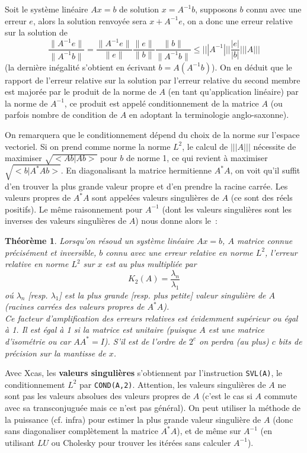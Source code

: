 \documentclass[a4paper,11pt]{article}
\newtheorem{thm}{Théorème}
\begin{document}
\begin{giacjshere}
Soit le syst\`eme lin\'eaire $Ax=b$ de solution $x=A^{-1}b$, 
supposons $b$ connu avec une erreur $e$, alors la solution renvoy\'ee
sera $x+A^{-1}e$, on a donc une erreur relative sur la solution de 
\[ \frac{\|A^{-1}e\|}{\|A^{-1}b\|} = \frac{\|A^{-1}e\|}{\|e\|} 
\frac{\|e\|}{\|b\|}
\frac{\|b\|}{\|A^{-1}b\|}  \leq |||A^{-1}|||  \frac{|e|}{|b|} |||A|||  \]
(la derni\`ere in\'egalit\'e s'obtient en \'ecrivant $b=A(A^{-1}b)$).
On en d\'eduit que le rapport de l'erreur relative sur la solution par l'erreur
relative du second membre est major\'ee par
le produit de la norme de $A$ (en tant qu'application lin\'eaire)
par la norme de $A^{-1}$, ce produit est appel\'e conditionnement
de la matrice $A$ (ou parfois nombre de condition de $A$ en adoptant
la terminologie anglo-saxonne).

On remarquera que le conditionnement d\'epend du choix de la norme sur
l'espace vectoriel.
Si on prend comme norme la norme $L^2$, le calcul de $|||A|||$
n\'ecessite de maximiser $\sqrt{<Ab|Ab>}$ pour $b$ de norme 1, ce qui revient
\`a maximiser $\sqrt{<b|A^* A b>}$. En diagonalisant la matrice hermitienne
$A^* A$, on voit qu'il suffit d'en trouver la plus grande valeur
propre et d'en prendre la racine carr\'ee. Les valeurs propres de
$A^*A$ sont appel\'ees valeurs singuli\`eres de $A$ (ce sont des
r\'eels positifs). Le m\^eme raisonnement pour $A^{-1}$ (dont les
valeurs singuli\`eres sont les inverses des valeurs singuli\`eres de $A$) nous
donne alors le~:
\begin{thm}
Lorsqu'on r\'esoud un syst\`eme lin\'eaire $Ax=b$, $A$ matrice connue
pr\'ecis\'ement et inversible, $b$ connu avec une erreur relative en
norme $L^2$, l'erreur relative en norme $L^2$ sur $x$ est au plus
multipli\'ee par
\[ K_2(A)= \frac{\lambda_n}{\lambda_1} \]
o\'u $\lambda_n$ [resp. $\lambda_1$] est la plus grande [resp. plus
petite] valeur singuli\`ere de $A$ (racines carr\'ees des
valeurs propres de $A^*A$).\\
Ce facteur d'amplification des erreurs relatives est \'evidemment
sup\'erieur ou \'egal \`a 1. Il est \'egal \`a 1 si la matrice est
unitaire (puisque $A$ est une matrice
d'isométrie ou car $AA^*=I$). 
S'il est de l'ordre de $2^c$ on perdra (au plus) $c$ bits de
pr\'ecision sur la mantisse de $x$.
\end{thm}
Avec Xcas, les {\bf valeurs singuli\`eres} 
s'obtiennent par l'instruction
\verb|SVL(A)|, le conditionnement $L^2$ par \verb|COND(A,2)|.
Attention, les valeurs singuli\`eres de $A$ ne sont pas les valeurs
absolues des valeurs propres de $A$ (c'est le cas si $A$ 
commute avec sa transconjugu\'ee mais ce n'est pas g\'en\'eral).
On peut utiliser la m\'ethode de la puissance (cf. infra) pour estimer la plus
grande valeur singuli\`ere de $A$ (donc sans diagonaliser compl\`etement
la matrice $A^*A$), et de m\^eme sur $A^{-1}$ (en utilisant $LU$
ou Cholesky pour trouver les it\'er\'ees sans calculer $A^{-1}$).


\end{giacjshere}
\end{document}
